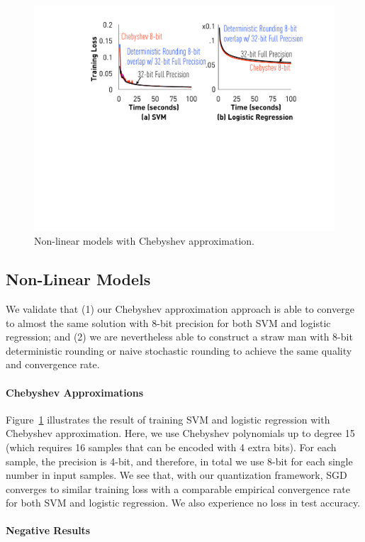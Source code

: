 \documentclass{article}
\begin{document}
\begin{figure}[t]
\centering
\includegraphics[width=0.8\columnwidth]{final-experiments/chebyshev} 
\caption{Non-linear models with Chebyshev approximation.}
\label{fig:chebyshev}
\end{figure}

\subsection{Non-Linear Models}

We validate that (1) our Chebyshev 
approximation approach is able to
converge to almost the same solution 
with 8-bit precision for both SVM
and logistic regression;
and (2) we are nevertheless able to construct
a straw man with 8-bit deterministic 
rounding or naive stochastic rounding
to achieve the same quality and convergence 
rate.

\paragraph{Chebyshev Approximations}

Figure~\ref{fig:chebyshev} illustrates
the result of training SVM
and logistic regression 
with Chebyshev approximation. Here,
we use Chebyshev polynomials up to
degree 15 (which requires 16 samples
that can be encoded with 4 extra 
bits). For each sample, the precision
is 4-bit, and therefore, in total
we use 8-bit for each single number
in input samples. We see that, 
with our quantization framework,
SGD converges to similar training loss 
with a comparable empirical convergence 
rate for both SVM and logistic regression.
We also experience no loss in test accuracy.



\paragraph{Negative Results}
\end{document}
